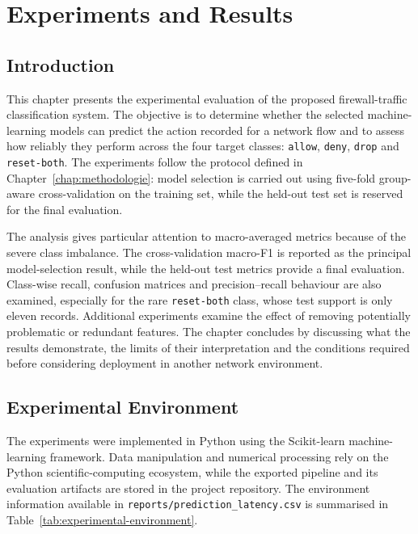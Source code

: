 \chapter{Experiments and Results}\label{chap:resultats}

\section{Introduction}\label{sec:results-introduction}

This chapter presents the experimental evaluation of the proposed firewall-traffic classification system. The objective is to determine whether the selected machine-learning models can predict the action recorded for a network flow and to assess how reliably they perform across the four target classes: \texttt{allow}, \texttt{deny}, \texttt{drop} and \texttt{reset-both}. The experiments follow the protocol defined in Chapter~\ref{chap:methodologie}: model selection is carried out using five-fold group-aware cross-validation on the training set, while the held-out test set is reserved for the final evaluation.

The analysis gives particular attention to macro-averaged metrics because of the severe class imbalance. The cross-validation macro-F1 is reported as the principal model-selection result, while the held-out test metrics provide a final evaluation. Class-wise recall, confusion matrices and precision--recall behaviour are also examined, especially for the rare \texttt{reset-both} class, whose test support is only eleven records. Additional experiments examine the effect of removing potentially problematic or redundant features. The chapter concludes by discussing what the results demonstrate, the limits of their interpretation and the conditions required before considering deployment in another network environment.

\section{Experimental Environment}\label{sec:experimental-environment}

The experiments were implemented in Python using the Scikit-learn machine-learning framework. Data manipulation and numerical processing rely on the Python scientific-computing ecosystem, while the exported pipeline and its evaluation artifacts are stored in the project repository. The environment information available in \texttt{reports/prediction\_latency.csv} is summarised in Table~\ref{tab:experimental-environment}.

